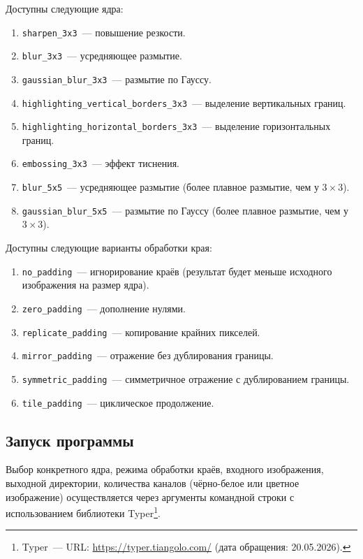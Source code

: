 \documentclass[a4paper]{article}
\begin{document}
Доступны следующие ядра: 
\begin{enumerate}
    \item \texttt{sharpen\_3x3}~--- повышение резкости.
    \item \texttt{blur\_3x3}~--- усредняющее размытие.
    \item \texttt{gaussian\_blur\_3x3}~--- размытие по Гауссу.
    \item \texttt{highlighting\_vertical\_borders\_3x3}~--- выделение вертикальных границ.
    \item \texttt{highlighting\_horizontal\_borders\_3x3}~--- выделение горизонтальных границ.
    \item \texttt{embossing\_3x3}~--- эффект тиснения.
    \item \texttt{blur\_5x5}~--- усредняющее размытие (более плавное размытие, чем у $3\times 3$).
    \item \texttt{gaussian\_blur\_5x5}~--- размытие по Гауссу (более плавное размытие, чем у $3\times 3$).
\end{enumerate}

Доступны следующие варианты обработки края:
\begin{enumerate}
    \item \texttt{no\_padding}~--- игнорирование краёв (результат будет меньше исходного изображения на размер ядра).
    \item \texttt{zero\_padding}~--- дополнение нулями.
    \item \texttt{replicate\_padding}~--- копирование крайних пикселей.
    \item \texttt{mirror\_padding}~--- отражение без дублирования границы.
    \item \texttt{symmetric\_padding}~--- симметричное отражение с дублированием границы.
    \item \texttt{tile\_padding}~--- циклическое продолжение.
\end{enumerate}

\subsection{Запуск программы}

Выбор конкретного ядра, режима обработки краёв, входного изображения, выходной директории, количества каналов (чёрно-белое или цветное изображение) осуществляется через аргументы командной строки с использованием библиотеки Typer\footnote{Typer~--- URL: \url{https://typer.tiangolo.com/} (дата обращения: 20.05.2026).}. 
\end{document}
